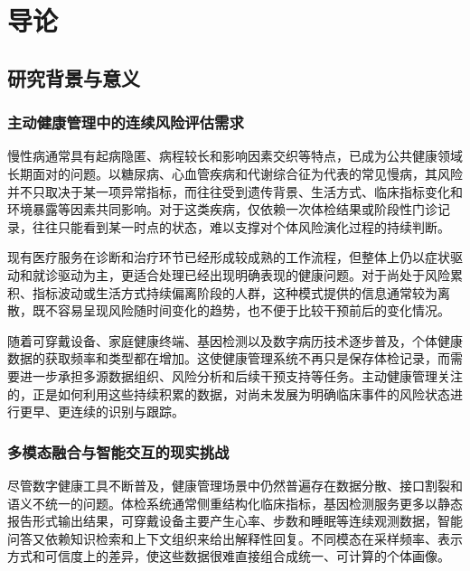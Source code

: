 
\chapter{导论}

\section{研究背景与意义}

\subsection{主动健康管理中的连续风险评估需求}

慢性病通常具有起病隐匿、病程较长和影响因素交织等特点，已成为公共健康领域长期面对的问题\cite{gbd2019global}。以糖尿病、心血管疾病和代谢综合征为代表的常见慢病，其风险并不只取决于某一项异常指标，而往往受到遗传背景、生活方式、临床指标变化和环境暴露等因素共同影响。对于这类疾病，仅依赖一次体检结果或阶段性门诊记录，往往只能看到某一时点的状态，难以支撑对个体风险演化过程的持续判断。

现有医疗服务在诊断和治疗环节已经形成较成熟的工作流程，但整体上仍以症状驱动和就诊驱动为主，更适合处理已经出现明确表现的健康问题。对于尚处于风险累积、指标波动或生活方式持续偏离阶段的人群，这种模式提供的信息通常较为离散，既不容易呈现风险随时间变化的趋势，也不便于比较干预前后的变化情况。

随着可穿戴设备、家庭健康终端、基因检测以及数字病历技术逐步普及，个体健康数据的获取频率和类型都在增加\cite{sockolow2021mhealth,zahedani2023digital,tang2024ehr}。这使健康管理系统不再只是保存体检记录，而需要进一步承担多源数据组织、风险分析和后续干预支持等任务。主动健康管理关注的，正是如何利用这些持续积累的数据，对尚未发展为明确临床事件的风险状态进行更早、更连续的识别与跟踪。

\subsection{多模态融合与智能交互的现实挑战}

尽管数字健康工具不断普及，健康管理场景中仍然普遍存在数据分散、接口割裂和语义不统一的问题。体检系统通常侧重结构化临床指标，基因检测服务更多以静态报告形式输出结果，可穿戴设备主要产生心率、步数和睡眠等连续观测数据，智能问答又依赖知识检索和上下文组织来给出解释性回复。不同模态在采样频率、表示方式和可信度上的差异，使这些数据很难直接组合成统一、可计算的个体画像\cite{ambalavanan2025ecosystem,carter2022ehrgenomics,epstein2023ehrwearable}。

